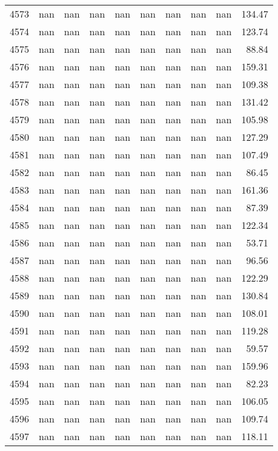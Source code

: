 \begin{tabular}{lrrrrrrrrr}
4573 & nan & nan & nan & nan & nan & nan & nan & nan & 134.47 \\
4574 & nan & nan & nan & nan & nan & nan & nan & nan & 123.74 \\
4575 & nan & nan & nan & nan & nan & nan & nan & nan & 88.84 \\
4576 & nan & nan & nan & nan & nan & nan & nan & nan & 159.31 \\
4577 & nan & nan & nan & nan & nan & nan & nan & nan & 109.38 \\
4578 & nan & nan & nan & nan & nan & nan & nan & nan & 131.42 \\
4579 & nan & nan & nan & nan & nan & nan & nan & nan & 105.98 \\
4580 & nan & nan & nan & nan & nan & nan & nan & nan & 127.29 \\
4581 & nan & nan & nan & nan & nan & nan & nan & nan & 107.49 \\
4582 & nan & nan & nan & nan & nan & nan & nan & nan & 86.45 \\
4583 & nan & nan & nan & nan & nan & nan & nan & nan & 161.36 \\
4584 & nan & nan & nan & nan & nan & nan & nan & nan & 87.39 \\
4585 & nan & nan & nan & nan & nan & nan & nan & nan & 122.34 \\
4586 & nan & nan & nan & nan & nan & nan & nan & nan & 53.71 \\
4587 & nan & nan & nan & nan & nan & nan & nan & nan & 96.56 \\
4588 & nan & nan & nan & nan & nan & nan & nan & nan & 122.29 \\
4589 & nan & nan & nan & nan & nan & nan & nan & nan & 130.84 \\
4590 & nan & nan & nan & nan & nan & nan & nan & nan & 108.01 \\
4591 & nan & nan & nan & nan & nan & nan & nan & nan & 119.28 \\
4592 & nan & nan & nan & nan & nan & nan & nan & nan & 59.57 \\
4593 & nan & nan & nan & nan & nan & nan & nan & nan & 159.96 \\
4594 & nan & nan & nan & nan & nan & nan & nan & nan & 82.23 \\
4595 & nan & nan & nan & nan & nan & nan & nan & nan & 106.05 \\
4596 & nan & nan & nan & nan & nan & nan & nan & nan & 109.74 \\
4597 & nan & nan & nan & nan & nan & nan & nan & nan & 118.11 \\

\end{tabular}
